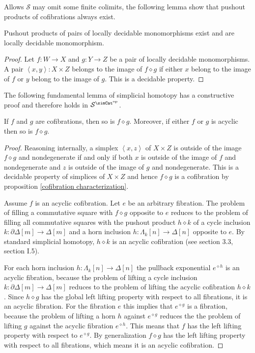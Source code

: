 \documentclass{tac}
\newcommand\cat\mathcal
\newcommand\dual{^{\mathrm{op}}}
\newcommand\s{^{\simCat\dual}}
\newcommand\of{:}
\newcommand\simplex\Delta
\newcommand\cycle{\partial\Delta}
\newcommand\horn\Lambda
\newcommand\tuplet[1]{\left\langle #1 \right\rangle}
\newcommand\pe[1]{^{\diamond #1}}
\newcommand\pp{\mathbin\diamond}
\begin{document}
Allows $\cat S$ may omit some finite colimits, the following lemma show that pushout products of cofibrations always exist.

\begin{lemma} Pushout products of pairs of locally decidable monomorphisms exist and are locally decidable monomorphism. \end{lemma}

\begin{proof} Let $f\of W\to X$ and $g\of Y\to Z$ be a pair of locally decidable monomorphisms. A pair $\tuplet{x,y}\of X\times Z$ belongs to the image of $f\pp g$ if either $x$ belong to the image of $f$ or $y$ belong to the image of $g$. This is a decidable property.
\end{proof}

The following fundamental lemma of simplicial homotopy has a constructive proof and therefore holds in $\cat S\s$.

\begin{lemma} If $f$ and $g$ are cofibrations, then so is $f\pp g$. Moreover, if either $f$ or $g$ is acyclic then so is $f\pp g$. \label{pushout product} \end{lemma}

\begin{proof} Reasoning internally, a simplex $\tuplet{x,z}$ of $X\times Z$ is outside of the image $f\pp g$ and nondegenerate if and only if both $x$ is outside of the image of $f$ and nondegenerate and $z$ is outside of the image of $g$ and nondegenerate. This is a decidable property of simplices of $X\times Z$ and hence $f\pp g$ is a cofibration by proposition \ref{cofibration characterization}. 

Assume $f$ is an acyclic cofibration. Let $e$ be an arbitrary fibration. The problem of filling a commutative square with $f\pp g$ opposite to $e$ reduces to the problem of filling all commutative squares with the pushout product $h\pp k$ of a cycle inclusion $k\of \cycle[m]\to \simplex[m]$ and a horn inclusion $h\of \horn_k[n]\to\simplex[n]$ opposite to $e$. By standard simplicial homotopy, $h\pp k$ is an acyclic cofibration (see \cite{Hovey99} section 3.3, \cite{GJSHT} section I.5).

For each horn inclusion $h\of \horn_k[n]\to \simplex[n]$ the pullback exponential $e\pe h$ is an acyclic fibration, because the problem of lifting a cycle inclusion $k\of \cycle[m]\to \simplex[m]$ reduces to the problem of lifting the acyclic cofibration $h\pp k$. Since $h\pp g$ has the global left lifting property with respect to all fibrations, it is an acyclic fibration. For the fibration $e$ this implies that $e\pe g$ is a fibration, because the problem of lifting a horn $h$ against $e\pe g$ reduces the the problem of lifting $g$ against the acyclic fibration $e\pe h$. This means that $f$ has the left lifting property with respect to $e\pe g$. By generalization $f\pp g$ has the left lifting property with respect to all fibrations, which means it is an acyclic cofibration.
\end{proof}
\end{document}
